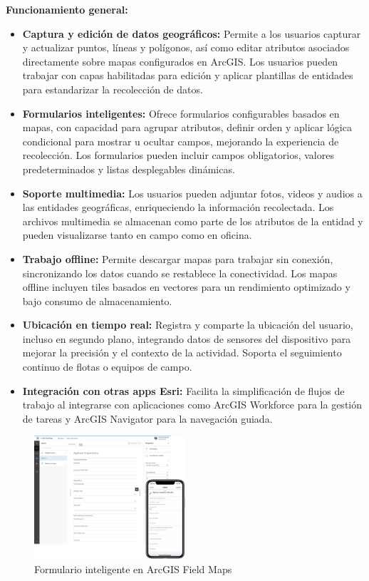 \documentclass{article}
\begin{document}
\textbf{Funcionamiento general:}
\begin{itemize}
  \item \textbf{Captura y edición de datos geográficos:} Permite a los usuarios capturar y actualizar puntos, líneas y polígonos, así como editar atributos asociados directamente sobre mapas configurados en ArcGIS. Los usuarios pueden trabajar con capas habilitadas para edición y aplicar plantillas de entidades para estandarizar la recolección de datos.
  
  \item \textbf{Formularios inteligentes:} Ofrece formularios configurables basados en mapas, con capacidad para agrupar atributos, definir orden y aplicar lógica condicional para mostrar u ocultar campos, mejorando la experiencia de recolección. Los formularios pueden incluir campos obligatorios, valores predeterminados y listas desplegables dinámicas.
  
  \item \textbf{Soporte multimedia:} Los usuarios pueden adjuntar fotos, videos y audios a las entidades geográficas, enriqueciendo la información recolectada. Los archivos multimedia se almacenan como parte de los atributos de la entidad y pueden visualizarse tanto en campo como en oficina.
  
  \item \textbf{Trabajo offline:} Permite descargar mapas para trabajar sin conexión, sincronizando los datos cuando se restablece la conectividad. Los mapas offline incluyen tiles basados en vectores para un rendimiento optimizado y bajo consumo de almacenamiento.
  
  \item \textbf{Ubicación en tiempo real:} Registra y comparte la ubicación del usuario, incluso en segundo plano, integrando datos de sensores del dispositivo para mejorar la precisión y el contexto de la actividad. Soporta el seguimiento continuo de flotas o equipos de campo.
  
  \item \textbf{Integración con otras apps Esri:} Facilita la simplificación de flujos de trabajo al integrarse con aplicaciones como ArcGIS Workforce para la gestión de tareas y ArcGIS Navigator para la navegación guiada.
\end{itemize}

\begin{figure}[h]
  \centering
  \includegraphics[width=0.5\textwidth]{images/FieldMapsSmartForms.png}
  \caption{Formulario inteligente en ArcGIS Field Maps}
  \label{fig:fieldmapsform}
\end{figure}
\end{document}
